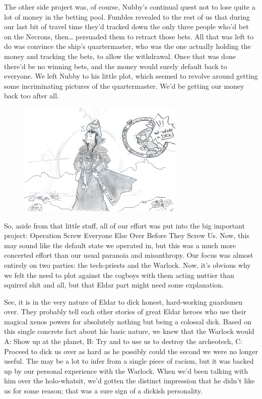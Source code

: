 The other side project was, of course, Nubby's continual quest not to lose quite a lot of money in the betting pool. 
Fumbles revealed to the rest of us that during our last bit of travel time they'd tracked down the only three people who'd bet on the Necrons, then… persuaded them to retract those bets. 
All that was left to do was convince the ship's quartermaster, who was the one actually holding the money and tracking the bets, to allow the withdrawal. 
Once that was done there'd be no winning bets, and the money would surely default back to everyone. 
We left Nubby to his little plot, which seemed to revolve around getting some incriminating pictures of the quartermaster. 
We'd be getting our money back too after all.
\begin{figure}
	\begin{center}
		\includegraphics[width=\figwidth]{pics/11/68.png}
	\end{center}
\end{figure}
So, aside from that little stuff, all of our effort was put into the big important project: 
Operation Screw Everyone Else Over Before They Screw Us. 
Now, this may sound like the default state we operated in, but this was a much more concerted effort than our usual paranoia and misanthropy. 
Our focus was almost entirely on two parties: 
the tech-priests and the Warlock. 
Now, it's obvious why we felt the need to plot against the cogboys with them acting nuttier than squirrel shit and all, but that Eldar part might need some explanation.

See, it is in the very nature of Eldar to dick honest, hard-working guardsmen over. 
They probably tell each other stories of great Eldar heroes who use their magical xenos powers for absolutely nothing but being a colossal dick. 
Based on this single concrete fact about his basic nature, we knew that the Warlock would A: 
Show up at the planet, B: 
Try and to use us to destroy the archeotech, C: 
Proceed to dick us over as hard as he possibly could the second we were no longer useful. 
The may be a lot to infer from a single piece of racism, but it was backed up by our personal experience with the Warlock. 
When we'd been talking with him over the holo-whatsit, we'd gotten the distinct impression that he didn't like us for some reason; 
that was a sure sign of a dickish personality.

